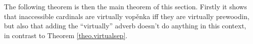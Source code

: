 \documentclass[../main]{subfiles}
\begin{document}
The following theorem is then the main theorem of this section. Firstly it shows that inaccessible cardinals are virtually vop\v enka iff they are virtually prewoodin, but also that adding the ``virtually'' adverb doesn't do anything in this context, in contrast to Theorem \ref{theo.virtualsep}. 

\end{document}
